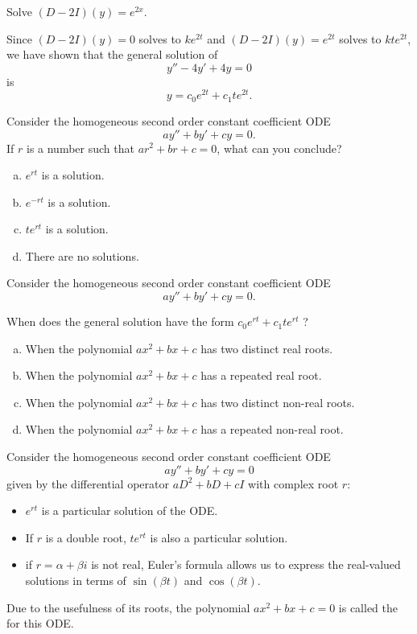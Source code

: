 \begin{applicationActivities}
\begin{activity}{15}
Solve \((D-2I)(y)=e^{2x}\).
\end{activity}


\begin{observation}
Since \((D-2I)(y)=0\) solves to \(ke^{2t}\) and \((D-2I)(y)=e^{2t}\) solves to
\(kte^{2t}\), 
we have shown that the general solution of \[y''-4y'+4y=0\] is \[y=c_0e^{2t}+c_1te^{2t}.\]
\end{observation}

\begin{activity}{10}
Consider the homogeneous second order constant coefficient ODE \[ay''+by'+cy=0.\]
If \(r\) is a number such that \(ar^2+br+c=0\), what can you conclude?
\begin{enumerate}[(a)]
\item \(e^{rt}\) is a solution.
\item \(e^{-rt}\) is a solution.
\item \(te^{rt}\) is a solution.
\item There are no solutions.
\end{enumerate}
\end{activity}

\begin{activity}{5}
Consider the homogeneous second order constant coefficient ODE \[ay''+by'+cy=0.\]

When does the general solution have the form \(c_0 e^{rt}+c_1 te^{rt}\) ?
\begin{enumerate}[(a)]
\item When the polynomial \(ax^2+bx+c\) has two distinct real roots.
\item When the polynomial \(ax^2+bx+c\) has a repeated real root.
\item When the polynomial \(ax^2+bx+c\) has two distinct non-real roots.
\item When the polynomial \(ax^2+bx+c\) has a repeated non-real root.
\end{enumerate}
\end{activity}


\begin{observation}
Consider the homogeneous second order constant coefficient ODE \[ay''+by'+cy=0\]
given by the differential operator \(aD^2+bD+cI\) with complex root \(r\):
\vfill
\begin{itemize}
\item \(e^{rt}\) is a particular solution of the ODE.
\item If \(r\) is a double root, \(te^{rt}\) is also a particular solution.
\item if \(r=\alpha+\beta i\) is not real, Euler's formula allows us to express the real-valued solutions in terms of 
  \(\sin(\beta t)\) and \(\cos(\beta t)\).
\end{itemize}
Due to the usefulness of its roots,
the polynomial \(ax^2+bx+c=0\) is called the  for this ODE.
\end{observation}
%
%



\end{applicationActivities}

